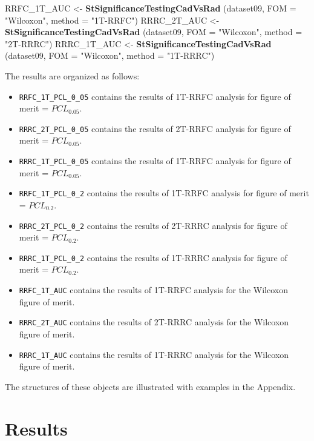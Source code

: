 \documentclass[
]{book}
\newenvironment{Shaded}{\begin{snugshade}}{\end{snugshade}}
\newcommand{\DataTypeTok}[1]{\textcolor[rgb]{0.13,0.29,0.53}{#1}}
\newcommand{\KeywordTok}[1]{\textcolor[rgb]{0.13,0.29,0.53}{\textbf{#1}}}
\newcommand{\NormalTok}[1]{#1}
\newcommand{\StringTok}[1]{\textcolor[rgb]{0.31,0.60,0.02}{#1}}
\begin{document}
\begin{Shaded}
\begin{Highlighting}[]
\NormalTok{RRFC_1T_AUC <-}\StringTok{ }\KeywordTok{StSignificanceTestingCadVsRad}\NormalTok{ (dataset09, }
\DataTypeTok{FOM =} \StringTok{"Wilcoxon"}\NormalTok{, }\DataTypeTok{method =} \StringTok{"1T-RRFC"}\NormalTok{)}
\NormalTok{RRRC_2T_AUC <-}\StringTok{ }\KeywordTok{StSignificanceTestingCadVsRad}\NormalTok{ (dataset09, }
\DataTypeTok{FOM =} \StringTok{"Wilcoxon"}\NormalTok{, }\DataTypeTok{method =} \StringTok{"2T-RRRC"}\NormalTok{)}
\NormalTok{RRRC_1T_AUC <-}\StringTok{ }\KeywordTok{StSignificanceTestingCadVsRad}\NormalTok{ (dataset09, }
\DataTypeTok{FOM =} \StringTok{"Wilcoxon"}\NormalTok{, }\DataTypeTok{method =} \StringTok{"1T-RRRC"}\NormalTok{)}
\end{Highlighting}
\end{Shaded}

The results are organized as follows:

\begin{itemize}
\item
  \texttt{RRFC\_1T\_PCL\_0\_05} contains the results of 1T-RRFC analysis for figure of merit = \(PCL_{0.05}\).
\item
  \texttt{RRRC\_2T\_PCL\_0\_05} contains the results of 2T-RRFC analysis for figure of merit = \(PCL_{0.05}\).
\item
  \texttt{RRRC\_1T\_PCL\_0\_05} contains the results of 1T-RRFC analysis for figure of merit = \(PCL_{0.05}\).
\item
  \texttt{RRFC\_1T\_PCL\_0\_2} contains the results of 1T-RRFC analysis for figure of merit = \(PCL_{0.2}\).
\item
  \texttt{RRRC\_2T\_PCL\_0\_2} contains the results of 2T-RRRC analysis for figure of merit = \(PCL_{0.2}\).
\item
  \texttt{RRRC\_1T\_PCL\_0\_2} contains the results of 1T-RRRC analysis for figure of merit = \(PCL_{0.2}\).
\item
  \texttt{RRFC\_1T\_AUC} contains the results of 1T-RRFC analysis for the Wilcoxon figure of merit.
\item
  \texttt{RRRC\_2T\_AUC} contains the results of 2T-RRRC analysis for the Wilcoxon figure of merit.
\item
  \texttt{RRRC\_1T\_AUC} contains the results of 1T-RRRC analysis for the Wilcoxon figure of merit.
\end{itemize}

The structures of these objects are illustrated with examples in the Appendix.

\hypertarget{standalone-cad-radiologists-results}{%
\section{Results}\label{standalone-cad-radiologists-results}}
\end{document}
